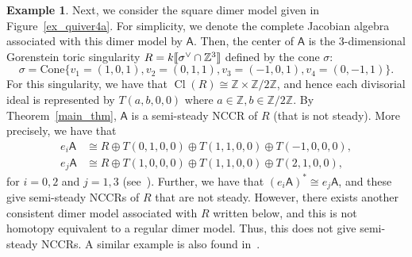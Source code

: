 \documentclass[11pt]{amsart}
\theoremstyle{definition}
\newtheorem{exem}[theo]{Example}
\newcommand{\ZZ}{\mathbb{Z}}
\newcommand{\sfA}{\mathsf{A}}
\DeclareMathOperator{\Cl}{Cl}
\newcommand{\llbracket}{\mathopen{[\mkern -2.7mu[}}
\newcommand{\rrbracket}{\mathclose{]\mkern -2.7mu]}}
\begin{document}
\begin{exem}\label{ex_semisteady}
Next, we consider the square dimer model given in Figure~\ref{ex_quiver4a}. For simplicity, we denote the complete Jacobian algebra associated with this dimer model by $\sfA$. Then, the center of $\sfA$ is the $3$-dimensional Gorenstein toric singularity $R=k\llbracket \sigma^\vee\cap\ZZ^3\rrbracket $ defined by the cone $\sigma$:
\[
\sigma=\mathrm{Cone}\{v_1=(1,0,1), v_2=(0,1,1), v_3=(-1,0,1), v_4=(0,-1,1) \}.
\]
For this singularity, we have that $\Cl(R)\cong\ZZ\times\ZZ/2\ZZ$, and hence each divisorial ideal is represented by $T(a,b,0,0)$ where $a\in\ZZ, b\in\ZZ/2\ZZ$. By Theorem~\ref{main_thm}, $\sfA$ is a semi-steady NCCR of $R$ (that is not steady). More precisely, we have that
\begin{align*}
e_i\sfA&\cong R\oplus T(0,1,0,0)\oplus T(1,1,0,0)\oplus T(-1,0,0,0), \\
e_j\sfA&\cong R\oplus T(1,0,0,0)\oplus T(1,1,0,0)\oplus T(2,1,0,0), 
\end{align*} 
for $i=0,2$ and $j=1,3$ (see~\cite[Subsection~5.2]{Nak}). Further, we have that $(e_i\sfA)^*\cong e_j\sfA$, and these give semi-steady NCCRs of $R$ that are not steady. However, there exists another consistent dimer model associated with $R$ written below, and this is not homotopy equivalent to a regular dimer model. Thus, this does not give semi-steady NCCRs. A similar example is also found in~\cite[Subsection~5.11]{Nak}.




\begin{center}
{}
\end{center}
\end{exem}
\end{document}
